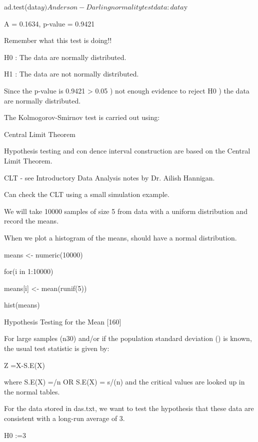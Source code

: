 \begin{frame}
ad.test(data$y)

Anderson-Darling normality test

data: data$y

A = 0.1634, p-value = 0.9421

 

Remember what this test is doing!!

H0 : The data are normally distributed.

H1 : The data are not normally distributed.

Since the p-value is 0.9421 > 0.05 ) not enough evidence to reject H0 ) the data are normally distributed.

 

The Kolmogorov-Smirnov test is carried out using:

 

Central Limit Theorem

Hypothesis testing and con dence interval construction are based on the Central Limit Theorem.

CLT - see Introductory Data Analysis notes by Dr. Ailish Hannigan.

Can check the CLT using a small simulation example.

We will take 10000 samples of size 5 from data with a uniform distribution and record the means.

When we plot a histogram of the means, should have a normal distribution.

 

means <- numeric(10000)

for(i in 1:10000){

means[i] <- mean(runif(5))

}

hist(means)

 

Hypothesis Testing for the Mean [160]

For large samples (n30) and/or if the population standard deviation () is known, the usual test statistic is given by:


Z =X-S.E(X)

 

where S.E(X) =/n OR S.E(X) = s/(n) and the critical values are looked up in the normal tables.

 

For the data stored in das.txt, we want to test the hypothesis that these data are consistent with a long-run average of 3.

H0 :=3


\end{frame}
